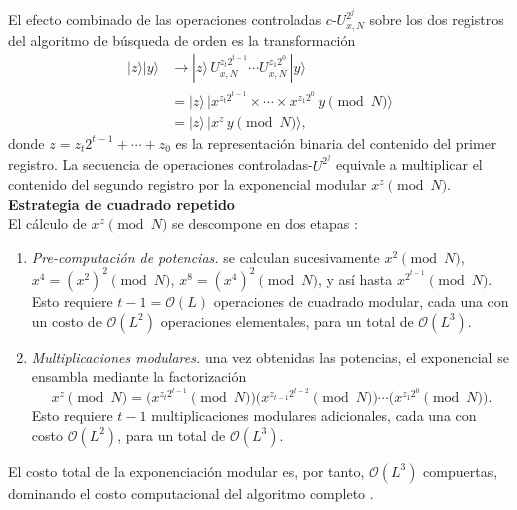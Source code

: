 \documentclass[12pt, spanish]{book}
\begin{document}
El efecto combinado de las operaciones controladas $c$-$U_{x,N}^{2^j}$ sobre los dos registros del algoritmo de búsqueda de orden es la transformación \cite{Nielsen2024}
\begin{align}
    |z\rangle|y\rangle & \to |z\rangle\, U_{x,N}^{z_{t}2^{t-1}} \cdots U_{x,N}^{z_1 2^0}\,|y\rangle \nonumber           \\
                       & = |z\rangle\, |x^{z_{t}2^{t-1}} \times \cdots \times x^{z_1 2^0}\, y \pmod{N}\rangle \nonumber \\
                       & = |z\rangle\, |x^z\, y \pmod{N}\rangle,
    \label{eq:exponenciacion_modular}
\end{align}
donde $z = z_{t}2^{t-1} + \cdots + z_0$ es la representación binaria del contenido del primer registro. La secuencia de operaciones controladas-$U^{2^j}$ equivale a multiplicar el contenido del segundo registro por la exponencial modular $x^z \pmod{N}$.\\

\textbf{Estrategia de cuadrado repetido}\\ 

El cálculo de $x^z \pmod{N}$ se descompone en dos etapas \cite{Nielsen2024}:
\begin{enumerate}
    \item \textit{Pre-computación de potencias.} se calculan sucesivamente $x^2 \pmod{N}$, $x^4 = (x^2)^2 \pmod{N}$, $x^8 = (x^4)^2 \pmod{N}$, y así hasta $x^{2^{t-1}} \pmod{N}$. Esto requiere $t - 1 = \mathcal{O}(L)$ operaciones de cuadrado modular, cada una con un costo de $\mathcal{O}(L^2)$ operaciones elementales, para un total de $\mathcal{O}(L^3)$.
    \item \textit{Multiplicaciones modulares.} una vez obtenidas las potencias, el exponencial se ensambla mediante la factorización
          \begin{equation}
              x^z \pmod{N} = \big(x^{z_{t}2^{t-1}} \pmod{N}\big) \big(x^{z_{t-1}2^{t-2}} \pmod{N}\big) \cdots \big(x^{z_1 2^{0}} \pmod{N}\big).
              \label{eq:repeated_squaring}
          \end{equation}
          Esto requiere $t - 1$ multiplicaciones modulares adicionales, cada una con costo $\mathcal{O}(L^2)$, para un total de $\mathcal{O}(L^3)$.
\end{enumerate}
El costo total de la exponenciación modular es, por tanto, $\mathcal{O}(L^3)$ compuertas, dominando el costo computacional del algoritmo completo \cite{Nielsen2024}.\\
\end{document}
